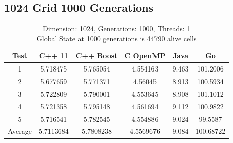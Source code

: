 \documentclass[11pt]{article} %
\begin{document}
\subsection{1024 Grid 1000 Generations}
\begin{table}[ht]

\caption{Dimension: 1024, Generations: 1000, Threads: 1\\Global State at 1000 generations is 44790 alive cells} %

\centering %

\begin{tabular}{c c c c c c} %

\hline\hline %

Test & C++ 11 & C++ Boost & C OpenMP & Java & Go \\ [0.5ex] %


\hline %

1 & 5.718475 & 5.765054	& 4.554163 & 9.463 & 101.2006 \\
2 & 5.677659 & 5.771371 & 4.56045 & 8.913 & 100.5934 \\
3 & 5.722809 & 5.790001	& 4.553645 & 8.908 & 101.1012 \\
4 & 5.721358 & 5.795148 & 4.561694 & 9.112 & 100.9822 \\
5 & 5.716541 & 5.782545 & 4.554886 & 9.024 & 99.5587 \\
Average & 5.7113684 & 5.7808238 & 4.5569676 & 9.084 & 100.68722 \\ [1ex]

\hline %

\end{tabular}

\end{table}
\end{document}
